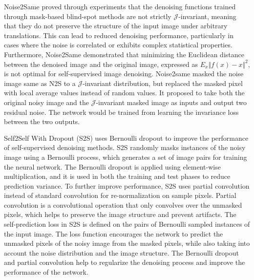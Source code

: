 \documentclass[conference]{IEEEtran}
\begin{document}
Noise2Same\cite{xie2020noise2same} proved through experiments that the denoising functions trained through mask-based blind-spot methods are not strictly $\mathcal{J}$-invariant, meaning that they do not preserve the structure of the input image under arbitrary translations. This can lead to reduced denoising performance, particularly in cases where the noise is correlated or exhibits complex statistical properties. Furthermore, Noise2Same demonstrated that minimizing the Euclidean distance between the denoised image and the original image, expressed as $E_x \Vert f(x) -x \Vert^2$,  is not optimal for self-supervised image denoising.
Noise2same masked the noise image same as N2S \cite{batson2019noise2self} to a $\mathcal{J}$-invariant distribution, but replaced the masked pixel with local average values instead of random values. It proposed to take both the original noisy image and the $\mathcal{J}$-invariant masked image as inputs and output two residual noise. The network would be trained from learning the invariance loss between the two outputs.

Self2Self With Dropout (S2S) \cite{quan2020self2self} uses Bernoulli dropout to improve the performance of self-supervised denoising methods. S2S randomly masks instances of the noisy image using a Bernoulli process, which generates a set of image pairs for training the neural network. The Bernoulli dropout is applied using element-wise multiplication, and it is used in both the training and test phases to reduce prediction variance. 
To further improve performance, S2S uses partial convolution instead of standard convolution for re-normalization on sample pixels. Partial convolution is a convolutional operation that only convolves over the unmasked pixels, which helps to preserve the image structure and prevent artifacts.
The self-prediction loss in S2S is defined on the pairs of Bernoulli sampled instances of the input image. The loss function encourages the network to predict the unmasked pixels of the noisy image from the masked pixels, while also taking into account the noise distribution and the image structure. The Bernoulli dropout and partial convolution help to regularize the denoising process and improve the performance of the network.
\end{document}
